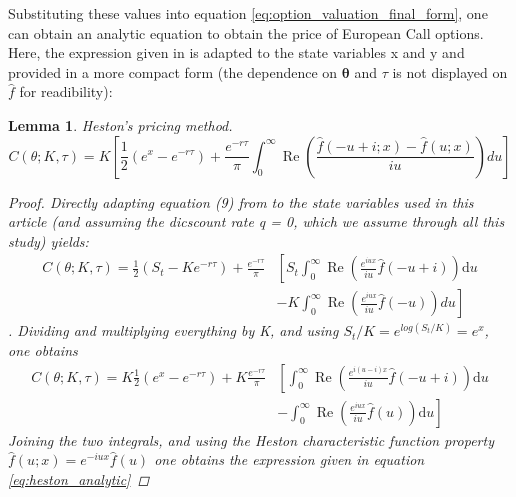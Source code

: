 \documentclass[12,twoside]{mammeTFM}
\newtheorem{lem}[thm]{Lemma}
\theoremstyle{definition}
\theoremstyle{remark}
\begin{document}
Substituting these values into equation \ref{eq:option_valuation_final_form}, one can obtain an analytic equation to obtain the price of European Call options. Here, the expression given in \cite{cui17} is adapted to the state variables x and y and provided in a more compact form (the dependence on $\boldsymbol{\theta}$ and $\tau$ is not displayed on $\hat{f}$ for readibility):

\begin{lem} Heston's pricing method.
\begin{equation} \label{eq:heston_analytic}
C(\theta ; K, \tau)= K \left[ \frac{1}{2}\left(e^x- e^{-r \tau}\right) 
 + \frac{e^{-r \tau}}{\pi}\int_{0}^{\infty} \operatorname{Re}\left( \frac{\hat{f}(-u+i; x) - \hat{f}(u; x)}{i u}\right) du\right]
\end{equation}
\begin{proof}
Directly adapting equation (9) from \cite{cui17} to the state variables used in this article (and assuming the dicscount rate q = 0, which we assume through all this study) yields:
\begin{equation}
\begin{aligned}
C(\theta ; K, \tau)= \frac{1}{2}\left(S_{t}-K e^{-r \tau}\right) + \frac{e^{-r \tau}}{\pi}& \left[  S_t \int_{0}^{\infty} \operatorname{Re}\left(\frac{e^{i u x}}{i u} \hat{f}(-u+i)\right) \mathrm{d} u\right. \\
&\left.- K \int_{0}^{\infty} \operatorname{Re}\left(\frac{e^{i u x}}{i u} \hat{f}(-u)\right) du\right]
\end{aligned}
\end{equation}
. Dividing and multiplying everything by K, and using $S_t/K = e^{log(S_t/K)} = e^x$, one obtains
\begin{equation}
\begin{aligned}
C(\theta ; K, \tau)= K \frac{1}{2}\left(e^x- e^{-r \tau}\right) + K\frac{e^{-r \tau}}{\pi}& \left[\int_{0}^{\infty} \operatorname{Re}\left(\frac{e^{i (u - i) x}}{i u} \hat{f}(-u+i)\right) \mathrm{d} u\right. \\
&\left.- \int_{0}^{\infty} \operatorname{Re}\left(\frac{e^{i u x}}{i u} \hat{f}(u)\right) \mathrm{d} u\right]
\end{aligned}
\end{equation}
Joining the two integrals, and using the Heston characteristic function property $\hat{f}(u; x) = e^{-iu x}\hat{f}(u)$ one obtains the expression given in equation \ref{eq:heston_analytic}
\end{proof}
\end{lem}
\end{document}
